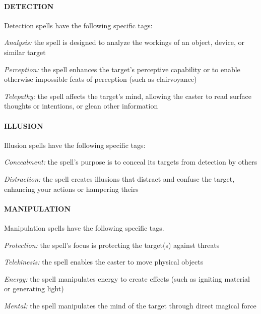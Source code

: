 \documentclass[oneside,10pt]{article}
\begin{document}
\begin{multicols}{2}
\begin{adjustwidth*}{.5cm}{.5cm}
\end{adjustwidth*}
\paragraph{DETECTION}

Detection spells have the following specific tags:
\begin{adjustwidth*}{.5cm}{.5cm}

\textit{Analysis:} the spell is designed to analyze the workings of
an object, device, or similar target

\textit{Perception:} the spell enhances the target’s perceptive capability or to enable otherwise impossible feats of perception (such as clairvoyance)

\textit{Telepathy:} the spell affects the target’s mind, allowing the
caster to read surface thoughts or intentions, or glean other information
\end{adjustwidth*}
\paragraph{ILLUSION}

Illusion spells have the following specific tags:
\begin{adjustwidth*}{.5cm}{.5cm}

\textit{Concealment:} the spell’s purpose is to conceal its targets
from detection by others

\textit{Distraction:} the spell creates illusions that distract and confuse the target, enhancing your actions or hampering theirs
\end{adjustwidth*}
\paragraph{MANIPULATION}

Manipulation spells have the following specific tags.
\begin{adjustwidth*}{.5cm}{.5cm}

\textit{Protection:} the spell’s focus is protecting the target(s)
against threats

\textit{Telekinesis:} the spell enables the caster to move physical
objects

\textit{Energy:} the spell manipulates energy to create effects
(such as igniting material or generating light)

\textit{Mental:} the spell manipulates the mind of the target
through direct magical force
\end{adjustwidth*}

\end{multicols}
\end{document}
